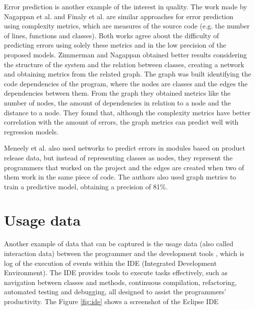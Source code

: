 Error prediction is another example of the interest in quality. The work made by Nagappan et al. \cite{NBZ06} and Finaly et al. \cite{FPC14} are similar approaches for error prediction using complexity metrics, which are measures of the source code (e.g. the number of lines, functions and classes). Both works agree about the difficulty of predicting errors using solely these metrics and in the low precision of the proposed models. Zimmerman and Nagappan \cite{ZN08} obtained better results considering the structure of the system and the relation between classes, creating a network and obtaining metrics from the related graph. The graph was built identifying the code dependencies of the program, where the nodes are classes and the edges the dependencies between them. From the graph they obtained metrics like the number of nodes, the amount of dependencies in relation to a node and the distance to a node. They found that, although the complexity metrics have better correlation with the amount of errors, the graph metrics can predict well with regression models.

Meneely et al. \cite{MWS08} also used networks to predict errors in modules based on product release data, but instead of representing classes as nodes, they represent the programmers that worked on the project and the edges are created when two of them work in the same piece of code. The authors also used graph metrics to train a predictive model, obtaining a precision of 81\%.

\section{Usage data }
Another example of data that can be captured is the usage data (also called interaction data) between the programmer and the development tools \cite{SnipesETALASD}, which is log of the execution of events within the IDE (Integrated Development Environment). The IDE provides tools to execute tasks effectively, such as navigation between classes and methods, continuous compilation, refactoring, automated testing and debugging, all designed to assist the programmers' productivity. The Figure \ref{fig:ide} shows a screenshot of the Eclipse IDE

